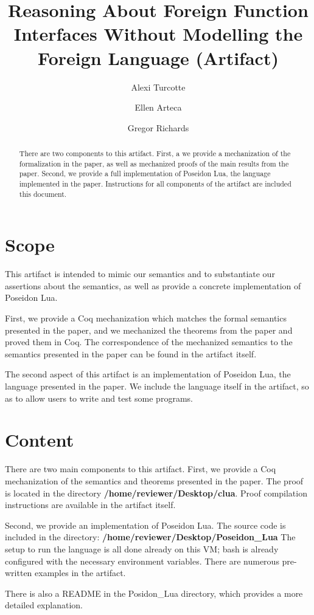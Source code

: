 \documentclass[a4paper,UKenglish]{darts-v2019}
\title{Reasoning About Foreign Function Interfaces Without Modelling the Foreign Language (Artifact)}
\author{Alexi Turcotte}{Northeastern University, USA}{}{}{}
\author{Ellen Arteca}{Northeastern University, USA}{}{}{}
\author{Gregor Richards}{University of Waterloo, Canada}{}{}{}
\newenvironment{scope}{\section{Scope}}{}
\newenvironment{content}{\section{Content}}{}
\begin{document}
\maketitle

\begin{abstract}
There are two components to this artifact.
First, a we provide a mechanization of the formalization in the paper, as well as mechanized proofs of the main results from the paper.
Second, we provide a full implementation of Poseidon Lua, the language implemented in the paper.
Instructions for all components of the artifact are included this document.

\end{abstract}

\begin{scope}

This artifact is intended to mimic our semantics and to substantiate our assertions about the semantics, as well as provide a concrete implementation of Poseidon Lua.

First, we provide a Coq mechanization which matches the formal semantics presented in the paper, and we mechanized the theorems from the paper and proved them in Coq.
The correspondence of the mechanized semantics to the semantics presented in the paper can be found in the artifact itself.

The second aspect of this artifact is an implementation of Poseidon Lua, the language presented in the paper.
We include the language itself in the artifact, so as to allow users to write and test some programs.

\end{scope}

\begin{content}
There are two main components to this artifact.
First, we provide a Coq mechanization of the semantics and theorems presented in the paper.
The proof is located in the directory \textbf{/home/reviewer/Desktop/clua}.
Proof compilation instructions are available in the artifact itself.

Second, we provide an implementation of Poseidon Lua.
The source code is included in the directory: \textbf{/home/reviewer/Desktop/Poseidon\_Lua}
The setup to run the language is all done already on this VM; bash is already configured with the necessary environment variables.
There are numerous pre-written examples in the artifact. 

There is also a README in the Posidon\_Lua directory, which provides a more detailed explanation.

\end{content}
\end{document}
